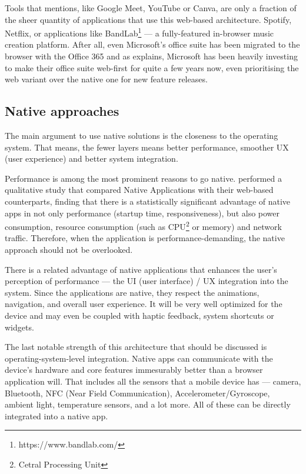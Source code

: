 \documentclass[
  digital,     %
  color,       %
  oneside,     %
  nosansbold,  %
  nocolorbold, %
  lof,         %
  lot,         %
]{fithesis4}
\begin{document}
Tools that \citeauthor{WebAppsReplacingNative} mentions, like Google Meet, YouTube or Canva, are only a fraction of the sheer quantity of applications that use this web-based architecture. Spotify, Netflix, or applications like BandLab\footnote{https://www.bandlab.com/} --- a fully-featured in-browser music creation platform. After all, even Microsoft's office suite has been migrated to the browser with the Office 365 and as \cite{OfficeForWeb} explains, Microsoft has been heavily investing to make their office suite web-first for quite a few years now, even prioritising the web variant over the native one for new feature releases.
\subsection{Native approaches}
The main argument to use native solutions is the closeness to the operating system. That means, the fewer layers means better performance, smoother UX (user experience) and better system integration. 

Performance is among the most prominent reasons to go native. \cite{NativeVsWeb} performed a qualitative study that compared Native Applications with their web-based counterparts, finding that there is a statistically significant advantage of native apps in not only performance (startup time, responsiveness), but also power consumption, resource consumption (such as CPU\footnote{Cetral Processing Unit} or memory) and network traffic. Therefore, when the application is performance-demanding, the native approach should not be overlooked. 

There is a related advantage of native applications that enhances the user's perception of performance --- the UI (user interface) / UX integration into the system. Since the applications are native, they respect the animations, navigation, and overall user experience. It will be very well optimized for the device and may even be coupled with haptic feedback, system shortcuts or widgets.

The last notable strength of this architecture that should be discussed is operating-system-level integration. Native apps can communicate with the device's hardware and core features immesurably better than a browser application will. That includes all the sensors that a mobile device has --- camera, Bluetooth, NFC (Near Field Communication), Accelerometer/Gyroscope, ambient light, temperature sensors, and a lot more. All of these can be directly integrated into a native app.
\end{document}
